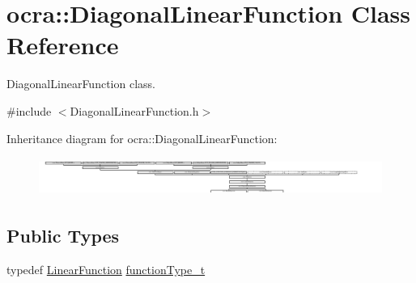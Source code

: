 \hypertarget{classocra_1_1DiagonalLinearFunction}{}\section{ocra\+:\+:Diagonal\+Linear\+Function Class Reference}
\label{classocra_1_1DiagonalLinearFunction}


Diagonal\+Linear\+Function class.  




{\ttfamily \#include $<$Diagonal\+Linear\+Function.\+h$>$}

Inheritance diagram for ocra\+:\+:Diagonal\+Linear\+Function\+:\begin{figure}[H]
\begin{center}
\leavevmode
\includegraphics[height=1.262480cm]{d3/d89/classocra_1_1DiagonalLinearFunction}
\end{center}
\end{figure}
\subsection*{Public Types}
\begin{DoxyCompactItemize}
\item 
typedef \hyperlink{classocra_1_1LinearFunction}{Linear\+Function} \hyperlink{classocra_1_1DiagonalLinearFunction_ab1d33ba63aea16f86fa88bf574333a39}{function\+Type\+\_\+t}
\end{DoxyCompactItemize}
